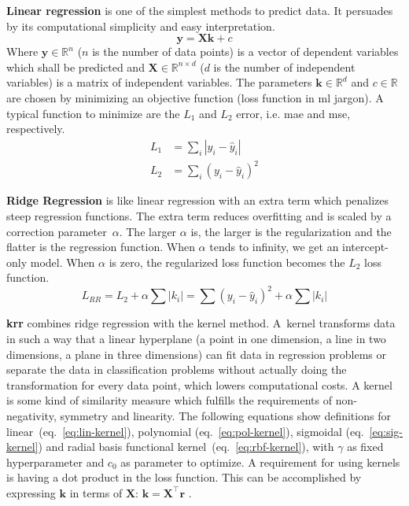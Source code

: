 %
\textbf{Linear regression} is one of the simplest methods to predict data. 
It persuades by its computational simplicity and easy interpretation. 
\begin{equation}
\mathbf{y} = \mathbf{X} \mathbf{k} +c 
\end{equation}
Where $\mathbf{y} \in \mathbb{R}^n$ ($n$ is the number of data points) is a vector of dependent variables which shall be predicted and $\mathbf{X}\in \mathbb{R}^{n\times d}$ ($d$ is the number of independent variables) is a matrix of independent variables. 
The parameters $\mathbf{k} \in \mathbb{R}^d$ and $c \in \mathbb{R}$ are chosen by minimizing an objective function (loss function in \gls{ml} jargon).
A typical function to minimize are the $L_1$ and $L_2$ error, i.e. \gls{mae} and \gls{mse}, respectively.
\begin{align}
L_1&= \sum_i |y_i - \hat y_i| \\%
L_2&= \sum_i(y_i - \hat y_i)^2 %
\end{align}
%

\textbf{Ridge Regression} is like linear regression with an extra term which penalizes steep regression functions.
The extra term reduces overfitting and is scaled by a correction parameter~$\alpha$. 
The larger $\alpha$ is, the larger is the regularization and the flatter is the regression function. 
When $\alpha$ tends to infinity, we get an intercept-only model.
When $\alpha$ is zero, the regularized loss function becomes the $L_2$ loss function.
\begin{equation}
    L_{RR} = L_2 + \alpha \sum |k_i| = \sum(y_i - \hat y_i)^2 + \alpha \sum |k_i| 
\end{equation}

\textbf{\Gls{krr}} combines ridge regression with the kernel method. 
A~kernel transforms data in such a way that a linear hyperplane (a point in one dimension, a line in two dimensions, 
a plane in three dimensions) can fit data in regression problems or separate the data in classification problems without actually doing the transformation for every data point, which lowers computational costs.
A kernel is some kind of similarity measure 
which fulfills the requirements of non-negativity, symmetry and linearity\cite{rupp2015machine}.
The following equations show definitions for 
linear~(eq.~\ref{eq:lin-kernel}), 
polynomial (eq.~\ref{eq:pol-kernel}), 
sigmoidal (eq.~\ref{eq:sig-kernel}) and 
radial basis functional kernel~(eq.~\ref{eq:rbf-kernel}), with $\gamma$ as fixed hyperparameter and $c_0$ as parameter to optimize.
A requirement for using kernels is having a dot product in the loss function. 
This can be accomplished by expressing $\mathbf{k}$ in terms of $\mathbf{X}$: $\mathbf{k}=\mathbf{X}^\top \mathbf{r}$
\cite{rudin2020least}.

